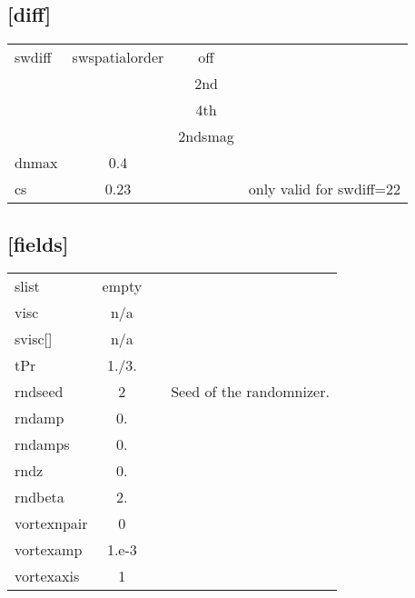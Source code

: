 \documentclass[a4paper,10pt]{extarticle}
\begin{document}
\subsection*{[diff]}
\tablelasttail{\hline}
\begin{supertabular}{lccl}
swdiff        & swspatialorder & off \\
              &       & 2nd \\
              &       & 4th \\
              &       & 2ndsmag \\ 
dnmax         & 0.4   & \\
cs            & 0.23  &  & only valid for swdiff=22 \\
\end{supertabular}
\subsection*{[fields]}
\tablelasttail{\hline}
\begin{supertabular}{lccl}
slist         & empty & \\
visc          & n/a   & \\
svisc[]       & n/a   & \\
tPr           & 1./3. & \\
rndseed       & 2     & & Seed of the randomnizer. \\
rndamp        & 0.    & \\
rndamps       & 0.    & \\
rndz          & 0.    & \\
rndbeta       & 2.    & \\
vortexnpair   & 0     & \\
vortexamp     & 1.e-3 & \\
vortexaxis    & 1     & \\
\end{supertabular}
\end{document}
